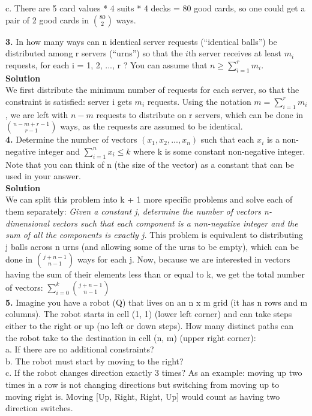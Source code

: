 \documentclass[10pt,a4paper,oneside,draft]{report}
\begin{document}
c. There are 5 card values * 4 suits * 4 decks = 80 good cards, so one could get a pair of 2 good cards in ${80 \choose 2}$ ways.

\textbf{3. }In how many ways can n identical server requests (“identical balls”) be distributed among r servers (“urns”) so that the $i$th server receives at least $m_i$ requests, for each i = 1, 2, ..., r ?
You can assume that $n \geq \sum_{i=1}^{r}m_i$. \\

\textbf{Solution}\\

We first distribute the minimum number of requests for each server, so that the constraint is satisfied: server i gets $m_i$ requests. Using the notation $m = \sum_{i=1}^{r}m_i$, we are left with $n - m$ requests to distribute on r servers, which can be done in 
$n - m + r - 1 \choose r - 1$ ways, as the requests are assumed to be identical. \\

\textbf{4.} Determine the number of vectors $(x_1 , x_2 , ..., x_n)$ such that each $x_i$ is a non-negative integer and $\sum_{i=1}^{n}x_i \leq k$ where k is some constant non-negative integer. Note that you can think of n (the size of the vector) as a constant that can be used in your answer. \\

\textbf{Solution} \\ 

We can split this problem into k + 1 more specific problems and solve each of them separately: \textit{Given a constant j, determine the number of vectors n-dimensional vectors such that each component is a non-negative integer and the sum of all the components is exactly j.} This problem is equivalent to distributing j balls across n urns (and allowing some of the urns to be empty), which can be done in $j + n - 1 \choose n - 1$ ways for each j. Now, because we are interested in vectors having the sum of their elements less than or equal to k, we get the total number of vectors: $\sum_{i=0}^{k} {j + n - 1 \choose n - 1}$ \\

\textbf{5.} Imagine you have a robot (Q) that lives on an n x m grid (it has n rows and m columns). The robot starts in cell (1, 1) (lower left corner) and can take steps either to the right or up (no left or down steps). How many distinct paths can the robot take to the destination in cell (n, m) (upper right corner): \\
a. If there are no additional constraints? \\
b. The robot must start by moving to the right? \\
c. If the robot changes direction exactly 3 times? As an example: moving up two times in a row is not changing directions but switching from moving up to moving right is. Moving [Up, Right, Right, Up] would count as having two direction switches. \\
\end{document}
